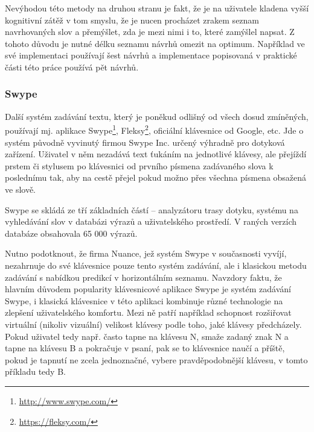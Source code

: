 \documentclass[a4paper,11pt]{article}
\begin{document}
Nevýhodou této metody na druhou stranu je fakt, že je na uživatele kladena vyšší kognitivní zátěž v tom smyslu, že je nucen procházet zrakem seznam navrhovaných slov a přemýšlet, zda je mezi nimi i to, které zamýšlel napsat. Z tohoto důvodu je nutné délku seznamu návrhů omezit na optimum. Například \parencite{neverilovaulipova2014} ve své implementaci používají šest návrhů a implementace popisovaná v praktické části této práce používá pět návrhů.

\subsubsection{Swype}

Další systém zadávání textu, který je poněkud odlišný od všech dosud zmíněných, používají mj. aplikace Swype\footnote{\url{http://www.swype.com/}}, Fleksy\footnote{\url{https://fleksy.com/}}, oficiální klávesnice od Google, etc. Jde o systém původně vyvinutý firmou Swype Inc. určený výhradně pro dotyková zařízení. Uživatel v něm nezadává text ťukáním na jednotlivé klávesy, ale přejíždí prstem či stylusem po klávesnici od prvního písmena zadávaného slova k poslednímu tak, aby na cestě přejel pokud možno přes všechna písmena obsažená ve slově. \parencite{swypeabout} %

Swype se skládá ze tří základních částí -- analyzátoru trasy dotyku, systému na vyhledávání slov v databázi výrazů a uživatelského prostředí. \parencite{kushler2006system} V raných verzích databáze obsahovala 65 000 výrazů. \parencite{rafeneedleman2008} %

Nutno podotknout, že firma Nuance, jež systém Swype v současnosti vyvíjí, nezahrnuje do své klávesnice pouze tento systém zadávání, ale i klasickou metodu zadávání s nabídkou predikcí v horizontálním seznamu. Navzdory faktu, že hlavním důvodem popularity klávesnicové aplikace Swype je systém zadávání Swype, i klasická klávesnice v této aplikaci kombinuje různé technologie na zlepšení uživatelského komfortu. Mezi ně patří například schopnost rozšiřovat virtuální (nikoliv vizuální) velikost klávesy podle toho, jaké klávesy předcházely. Pokud uživatel tedy např. často tapne na klávesu N, smaže zadaný znak N a tapne na klávesu B a pokračuje v psaní, pak se to klávesnice naučí a příště, pokud je tapnutí ne zcela jednoznačné, vybere pravděpodobnější klávesu, v tomto příkladu tedy B. \parencite{swypeabout} %
\end{document}
